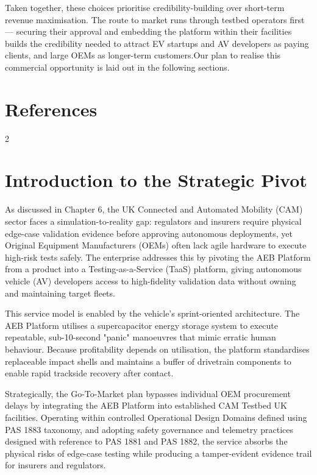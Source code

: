 \documentclass[11pt, a4paper]{report}
\numberwithin{equation}{section}
\newcommand{\compactbib}{%
  \vspace{-16pt}%
  \enlargethispage{20pt}%
  \section*{References}%
  \vspace{-33pt}%
  \begingroup
    \begin{singlespace}%
      \begin{multicols}{2}%
        \scriptsize
        \setlength{\bibitemsep}{0pt}%
        \printbibliography[heading=none]%
      \end{multicols}%
    \end{singlespace}%
  \endgroup
}
\begin{document}
\begin{refsection}
Taken together, these choices prioritise credibility-building over short-term revenue maximisation. The route to market runs through testbed operators first — securing their approval and embedding the platform within their facilities builds the credibility needed to attract EV startups and AV developers as paying clients, and large OEMs as longer-term customers.Our plan to realise this commercial opportunity is laid out in the following sections. 

\vspace{+14pt}
\compactbib

\end{refsection}

\begin{refsection}
\graphicspath{{../PaulVogelberg/Business/}}
\label{chap:strategy_stakeholder_analysis}

\section{Introduction to the Strategic Pivot}
\label{sec:ch7-taas-pivot}
As discussed in Chapter 6, the UK Connected and Automated Mobility (CAM) sector faces a simulation-to-reality gap: regulators and insurers require physical edge-case validation evidence before approving autonomous deployments, yet Original Equipment Manufacturers (OEMs) often lack agile hardware to execute high-risk tests safely. The enterprise addresses this by pivoting the AEB Platform from a product into a Testing-as-a-Service (TaaS) platform, giving autonomous vehicle (AV) developers access to high-fidelity validation data without owning and maintaining target fleets.

This service model is enabled by the vehicle's sprint-oriented architecture. The AEB Platform utilises a supercapacitor energy storage system to execute repeatable, sub-10-second "panic" manoeuvres that mimic erratic human behaviour. Because profitability depends on utilisation, the platform standardises replaceable impact shells and maintains a buffer of drivetrain components to enable rapid trackside recovery after contact.

Strategically, the Go-To-Market plan bypasses individual OEM procurement delays by integrating the AEB Platform into established CAM Testbed UK facilities. Operating within controlled Operational Design Domains defined using PAS 1883 taxonomy, and adopting safety governance and telemetry practices designed with reference to PAS 1881 and PAS 1882, the service absorbs the physical risks of edge-case testing while producing a tamper-evident evidence trail for insurers and regulators.


\end{refsection}
\end{document}
